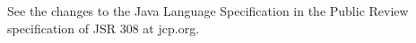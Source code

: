 \documentclass[10pt]{article}
\begin{document}
See the changes to the Java Language Specification in
the Public Review specification of JSR 308 at jcp.org.

% 
% 
% 
% 
% 
% 
% 
% 
% 
\end{document}
